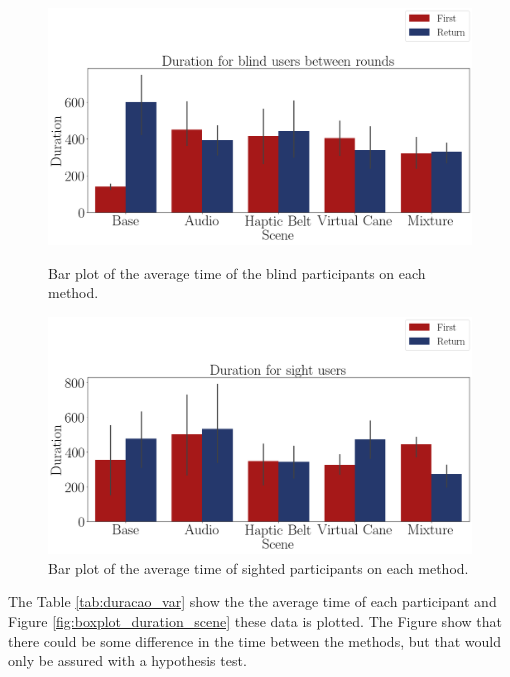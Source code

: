 \begin{figure}[!htb]
    \centering
    \begin{minipage}{\textwidth}
        \centering
        \includegraphics[width = 0.8\linewidth]{Resultados/Tempo/Figuras/png/barplot_duration_scene_blind.png}
        \caption{Bar plot of the average time of the blind participants on each method.}
        \label{fig:barplot_duration_scene_blind}
    \end{minipage}
    \begin{minipage}{\textwidth}
        \centering
        \includegraphics[width = 0.8\linewidth]{Resultados/Tempo/Figuras/png/barplot_duration_scene_sight.png}
        \caption{Bar plot of the average time of sighted participants on each method.}
        \label{fig:barplot_duration_scene_sight}
    \end{minipage}
\end{figure}


The Table \ref{tab:duracao_var} show the the average time of each participant and Figure \ref{fig:boxplot_duration_scene} these data is plotted. The Figure show that there could be some difference in the time between the methods, but that would only be assured with a hypothesis test. 

